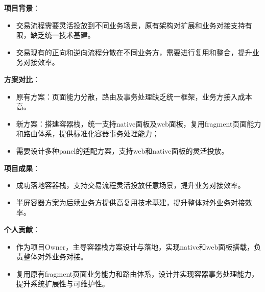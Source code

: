 \documentclass[]{deedy-resume-openfont}
\begin{document}
\begin{minipage}[t]{0.75\textwidth}
\vspace{0.1em}
\vspace{0.1em}
\begin{tightemize}
    \item \textbf{项目背景}：
        \begin{itemize}
            \item 交易流程需要灵活投放到不同业务场景，原有架构对扩展和业务对接支持有限，缺乏统一技术基建。
            \item 交易现有的正向和逆向流程分散在不同业务方，需要进行复用和整合，提升业务对接效率。
        \end{itemize}
    \item \textbf{方案对比}：
        \begin{itemize}
            \item 原有方案：页面能力分散，路由及事务处理缺乏统一框架，业务方接入成本高。
            \item 新方案：搭建容器栈，统一支持native面板及web面板，复用fragment页面能力和路由体系，提供标准化容器事务处理能力；
            \item 需要设计多种panel的适配方案，支持web和native面板的灵活投放。
        \end{itemize}
    \item \textbf{项目成果}：
        \begin{itemize}
            \item 成功落地容器栈，支持交易流程灵活投放任意场景，提升业务对接效率。
            \item 半屏容器方案为后续业务方提供高复用技术基建，提升整体对外业务对接效率。
        \end{itemize}
    \item \textbf{个人贡献}：
        \begin{itemize}
            \item 作为项目Owner，主导容器栈方案设计与落地，实现native和web面板搭载，负责整体对外业务对接。
            \item 复用原有fragment页面业务能力和路由体系，设计并实现容器事务处理能力，提升系统扩展性与可维护性。
        \end{itemize}
\end{tightemize}
\sectionsep
\end{minipage}


\end{document}
